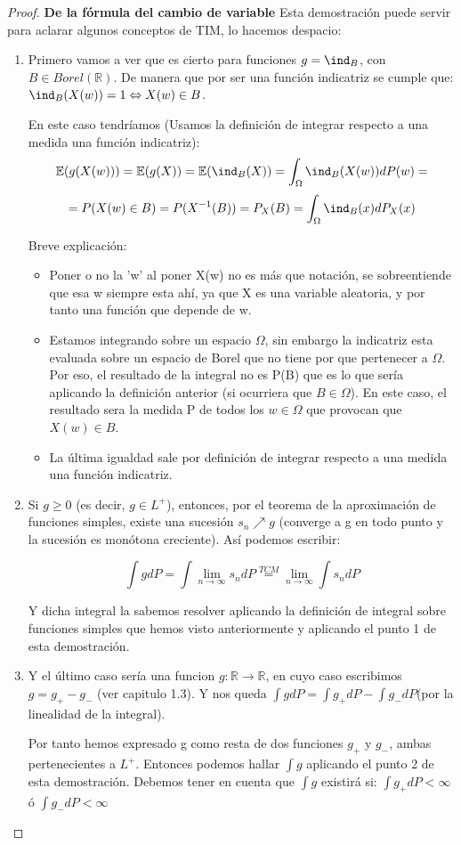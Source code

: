 \documentclass{apuntes}
\begin{document}
\begin{proof}
\textbf{De la fórmula del cambio de variable} Esta demostración puede servir para aclarar algunos conceptos de TIM, lo hacemos despacio:

\begin{enumerate}
\item Primero vamos a ver que es cierto para funciones $g=\ind_{B}$, con $B \in Borel(\mathbb{R})$. De manera que por ser una función indicatriz se cumple que: $\ind_{B}(X(w))=1 \Leftrightarrow X(w) \in B$.

En este caso tendríamos (Usamos la definición de integrar respecto a una medida una función indicatriz):
\[
\mathbb{E}(g(X(w))) = \mathbb{E}(g(X)) = \mathbb{E}(\ind_{B}(X))=\int_{\Omega}\ind_{B}(X(w))dP(w) =
\]
\[
= P(X(w)\in B) = P(X^{-1}(B))=P_X(B)=\int_{\Omega}\ind_{B}(x)dP_X(x)
\]

Breve explicación:
\begin{itemize}
\item Poner o no la 'w' al poner X(w) no es más que notación, se sobreentiende que esa w siempre esta ahí, ya que X es una variable aleatoria, y por tanto una función que depende de w.
\item Estamos integrando sobre un espacio $\Omega$, sin embargo la indicatriz esta evaluada sobre un espacio de Borel que no tiene por que pertenecer a $\Omega$. Por eso, el resultado de la integral no es P(B) que es lo que sería aplicando la definición anterior (si ocurriera que $B\in \Omega$). En este caso, el resultado sera la medida P de todos los $w \in \Omega$ que provocan que $X(w) \in B$.
\item La última igualdad sale por definición de integrar respecto a una medida una función indicatriz.
\end{itemize}
\item Si $g \geq 0$ (es decir, $g \in L^+$), entonces, por el teorema de la aproximación de funciones simples, existe una sucesión $s_n\nearrow g$ (converge a g en todo punto y la sucesión es monótona creciente). Así podemos escribir:

\[
\int g dP = \int \lim_{n \rightarrow \infty}s_n dP \stackrel{TCM}{=} \lim_{n \rightarrow \infty}\int s_n dP
\]

Y dicha integral la sabemos resolver aplicando la definición de integral sobre funciones simples que hemos visto anteriormente y aplicando el punto 1 de esta demostración.
\item Y el último caso sería una funcion $g:\mathbb{R} \rightarrow \mathbb{R}$, en cuyo caso escribimos $g=g_+-g_-$ (ver capitulo 1.3). Y nos queda $\int gdP = \int g_+dP -\int g_-dP$(por la linealidad de la integral).

Por tanto hemos expresado g como resta de dos funciones $g_+$ y $g_-$, ambas pertenecientes a $L^+$. Entonces podemos hallar $\int g$ aplicando el punto 2 de esta demostración. Debemos tener en cuenta que $\int g$ existirá si: $\int g_+dP < \infty$ ó $\int g_-dP < \infty$

\end{enumerate}
\end{proof}
\end{document}
